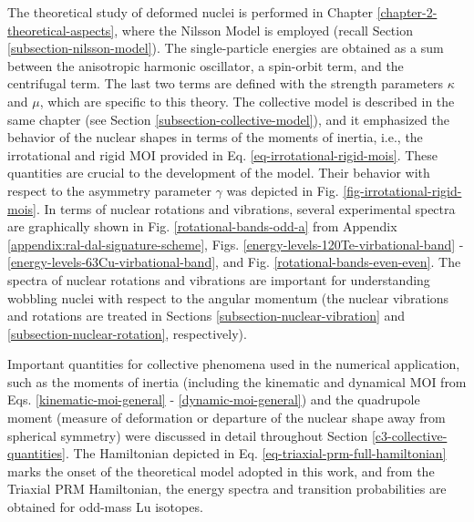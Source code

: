 The theoretical study of deformed nuclei is performed in Chapter \ref{chapter-2-theoretical-aspects}, where the Nilsson Model is employed (recall Section \ref{subsection-nilsson-model}). The single-particle energies are obtained as a sum between the anisotropic harmonic oscillator, a spin-orbit term, and the centrifugal term. The last two terms are defined with the strength parameters $\kappa$ and $\mu$, which are specific to this theory. The collective model is described in the same chapter (see Section \ref{subsection-collective-model}), and it emphasized the behavior of the nuclear shapes in terms of the moments of inertia, i.e., the irrotational and rigid MOI provided in Eq. \eqref{eq-irrotational-rigid-mois}. These quantities are crucial to the development of the model. Their behavior with respect to the asymmetry parameter $\gamma$ was depicted in Fig. \ref{fig-irrotational-rigid-mois}. In terms of nuclear rotations and vibrations, several experimental spectra are graphically shown in Fig. \ref{rotational-bands-odd-a} from Appendix \ref{appendix:ral-dal-signature-scheme}, Figs. \ref{energy-levels-120Te-virbational-band} - \ref{energy-levels-63Cu-virbational-band}, and Fig. \ref{rotational-bands-even-even}. The spectra of nuclear rotations and vibrations are important for understanding wobbling nuclei with respect to the angular momentum (the nuclear vibrations and rotations are treated in Sections \ref{subsection-nuclear-vibration} and \ref{subsection-nuclear-rotation}, respectively). 

Important quantities for collective phenomena used in the numerical application, such as the moments of inertia (including the kinematic and dynamical MOI from Eqs. \eqref{kinematic-moi-general} - \eqref{dynamic-moi-general}) and the quadrupole moment (measure of deformation or departure of the nuclear shape away from spherical symmetry) were discussed in detail throughout Section \ref{c3-collective-quantities}. The Hamiltonian depicted in Eq. \eqref{eq-triaxial-prm-full-hamiltonian} marks the onset of the theoretical model adopted in this work, and from the Triaxial PRM Hamiltonian, the energy spectra and transition probabilities are obtained for odd-mass Lu isotopes.

